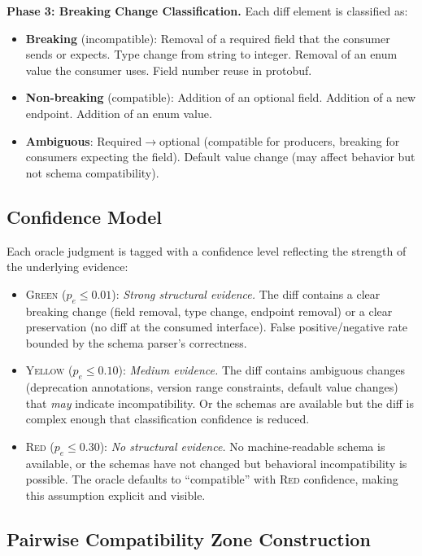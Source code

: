 \documentclass[10pt,twocolumn]{article}
\begin{document}
\textbf{Phase 3: Breaking Change Classification.} Each diff element is classified as:
\begin{itemize}
\item \textbf{Breaking} (incompatible): Removal of a required field that the consumer sends or expects. Type change from string to integer. Removal of an enum value the consumer uses. Field number reuse in protobuf.
\item \textbf{Non-breaking} (compatible): Addition of an optional field. Addition of a new endpoint. Addition of an enum value.
\item \textbf{Ambiguous}: Required$\to$optional (compatible for producers, breaking for consumers expecting the field). Default value change (may affect behavior but not schema compatibility).
\end{itemize}

\subsection{Confidence Model}
\label{sec:confidence}

Each oracle judgment is tagged with a confidence level reflecting the strength of the underlying evidence:

\begin{itemize}
\item \textsc{Green} ($p_e \leq 0.01$): \emph{Strong structural evidence.} The diff contains a clear breaking change (field removal, type change, endpoint removal) or a clear preservation (no diff at the consumed interface). False positive/negative rate bounded by the schema parser's correctness.

\item \textsc{Yellow} ($p_e \leq 0.10$): \emph{Medium evidence.} The diff contains ambiguous changes (deprecation annotations, version range constraints, default value changes) that \emph{may} indicate incompatibility. Or the schemas are available but the diff is complex enough that classification confidence is reduced.

\item \textsc{Red} ($p_e \leq 0.30$): \emph{No structural evidence.} No machine-readable schema is available, or the schemas have not changed but behavioral incompatibility is possible. The oracle defaults to ``compatible'' with \textsc{Red} confidence, making this assumption explicit and visible.
\end{itemize}

\subsection{Pairwise Compatibility Zone Construction}
\label{sec:compat-zones}
\end{document}
